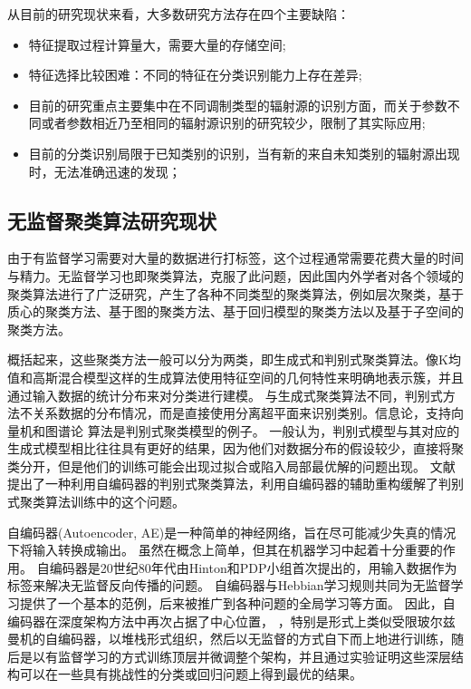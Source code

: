 从目前的研究现状来看，大多数研究方法存在四个主要缺陷：
\begin{itemize}
	\item 特征提取过程计算量大，需要大量的存储空间;
	\item 特征选择比较困难：不同的特征在分类识别能力上存在差异;
	\item 目前的研究重点主要集中在不同调制类型的辐射源的识别方面，而关于参数不同或者参数相近乃至相同的辐射源识别的研究较少，限制了其实际应用;
	\item 目前的分类识别局限于已知类别的识别，当有新的来自未知类别的辐射源出现时，无法准确迅速的发现；
\end{itemize}

\subsection{无监督聚类算法研究现状}
由于有监督学习需要对大量的数据进行打标签，这个过程通常需要花费大量的时间与精力。无监督学习也即聚类算法，克服了此问题，因此国内外学者对各个领域的聚类算法进行了广泛研究，产生了各种不同类型的聚类算法，例如层次聚类，基于质心的聚类方法、基于图的聚类方法、基于回归模型的聚类方法以及基于子空间的聚类方法。

概括起来，这些聚类方法一般可以分为两类，即生成式和判别式聚类算法。像K均值和高斯混合模型这样的生成算法使用特征空间的几何特性来明确地表示簇，并且通过输入数据的统计分布来对分类进行建模。
与生成式聚类算法不同，判别式方法不关系数据的分布情况，而是直接使用分离超平面来识别类别。信息论，支持向量机和图谱论	算法是判别式聚类模型的例子。
一般认为，判别式模型与其对应的生成式模型相比往往具有更好的结果，因为他们对数据分布的假设较少，直接将聚类分开，但是他们的训练可能会出现过拟合或陷入局部最优解的问题出现。
文献\cite{xie2016unsupervised}提出了一种利用自编码器的判别式聚类算法，利用自编码器的辅助重构缓解了判别式聚类算法训练中的这个问题。

自编码器(Autoencoder, AE)是一种简单的神经网络，旨在尽可能减少失真的情况下将输入转换成输出。
虽然在概念上简单，但其在机器学习中起着十分重要的作用。
自编码器是20世纪80年代由Hinton和PDP小组首次提出的，用输入数据作为标签来解决无监督反向传播的问题。
自编码器与Hebbian学习规则共同为无监督学习提供了一个基本的范例，后来被推广到各种问题的全局学习等方面。
因此，自编码器在深度架构方法中再次占据了中心位置，
，特别是形式上类似受限玻尔兹曼机的自编码器，以堆栈形式组织，然后以无监督的方式自下而上地进行训练，随后是以有监督学习的方式训练顶层并微调整个架构，并且通过实验证明这些深层结构可以在一些具有挑战性的分类或回归问题上得到最优的结果。

